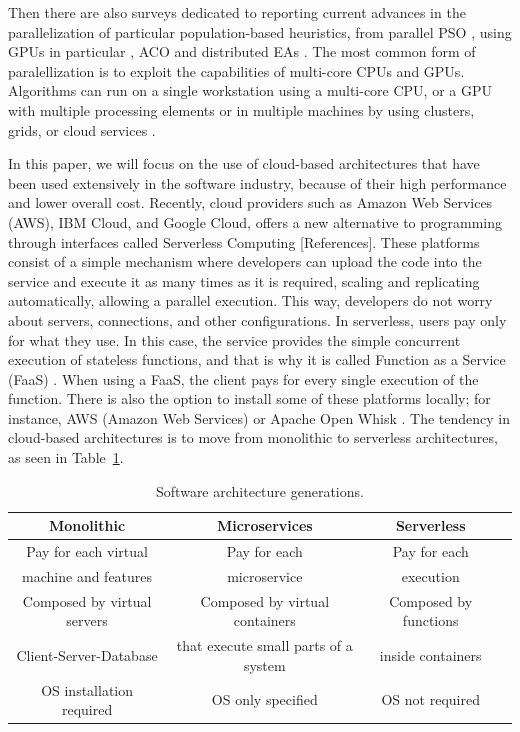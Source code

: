 \documentclass[runningheads]{llncs}
\begin{document}
Then there are also surveys dedicated to reporting current advances in the
parallelization of particular population-based heuristics, from parallel PSO
\cite{Lalwani2019}, using GPUs in particular \cite{tan2015survey}, ACO
\cite{pedemonte2011survey} and distributed EAs \cite{gong2015distributed}.  
The most common form of paralellization is to exploit the capabilities of
multi-core CPUs and GPUs. Algorithms can run on a single workstation using a
multi-core CPU, or a GPU with multiple processing elements or in multiple
machines by using clusters, grids, or cloud services \cite{Lalwani2019}.

In this paper, we will focus on the use of cloud-based architectures that have
been used extensively in the software industry, because of their high
performance and lower overall cost. Recently, cloud providers such as Amazon Web
Services (AWS), IBM Cloud, and Google Cloud, offers a new alternative to
programming through interfaces called Serverless Computing [References]. These
platforms consist of a simple mechanism where developers can upload the code
into the service and execute it as many times as it is required, scaling and
replicating automatically, allowing a parallel execution. This way, developers
do not worry about servers, connections, and other configurations. In
serverless, users pay only for what they use. In this case, the service provides
the simple concurrent execution of stateless functions, and that is why it is
called Function as a Service (FaaS) \cite{Hellerstein2018,Everywhere,Baird2016}
. When using a FaaS, the client pays for every single execution of the function.
There is also the option to install some of these platforms locally; for
instance, AWS (Amazon Web Services) \cite{Baird2016} or Apache Open Whisk
\cite{Guerv2018}. The tendency in cloud-based architectures is to move from 
monolithic to serverless architectures, as seen in Table~\ref{table:architectures}.     

\begin{table}[htp]
  \caption{Software architecture generations.}
  \label{table:architectures}
  \centering
  \begin{tabular}{|c|c|c|c|}
  \hline
  Monolithic & Microservices & Serverless \\
  \hline
  Pay for each virtual  & Pay for each  & Pay for each \\
  machine and features  & microservice  & execution \\
  \hline
  Composed by virtual servers  & Composed by virtual containers & Composed by functions \\
  Client-Server-Database & that execute small parts of a system & inside containers \\
  \hline
  OS installation required & OS only specified & OS not required\\
  \hline
  \end{tabular}
  \end{table}
\end{document}
